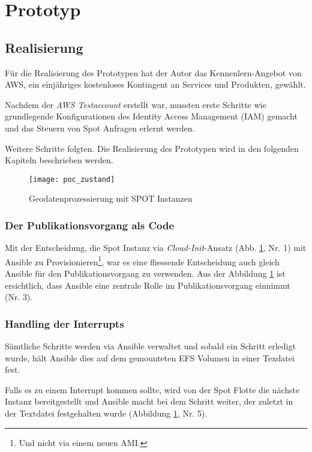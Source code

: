 \section{Prototyp}
\subsection{Realisierung}
Für die Realisierung des Prototypen hat der Autor das Kennenlern-Angebot von AWS, ein einjähriges kostenloses Kontingent an Services und Produkten\cite{FreeTier2020}, gewählt. 

Nachdem der \emph{AWS Testaccount} erstellt war, mussten erste Schritte wie grundlegende Konfigurationen des Identity Access Management (IAM) gemacht und das Steuern von Spot Anfragen erlernt werden.

Weitere Schritte folgten. Die Realisierung des Prototypen wird in den folgenden Kapiteln beschrieben werden.

\begin{figure}[H]
	\centering
	\texttt{[image: poc\_zustand]}
	\caption{Geodatenprozessierung mit SPOT Instanzen}
	\label{fig:ist_zustand}
\end{figure}

\subsubsection{Der Publikationsvorgang als Code}
Mit der Entscheidung, die Spot Instanz via \emph{Cloud-Init}-Ansatz (Abb. \ref{fig:ist_zustand}, Nr. 1) mit Ansible zu Provisionieren\footnote{Und nicht via einem neuen AMI.}, war es eine fliessende Entscheidung auch gleich Ansible für den Publikationsvorgang zu verwenden. Aus der Abbildung \ref{fig:ist_zustand} ist ersichtlich, dass Ansible eine zentrale Rolle im Publikationsvorgang einnimmt (Nr. 3). 




\subsubsection{Handling der Interrupts}
Sämtliche Schritte werden via Ansible verwaltet und sobald ein Schritt erledigt wurde, hält Ansible dies auf dem gemounteten EFS Volumen in einer Texdatei fest.

Falls es zu einem Interrupt kommen sollte, wird von der Spot Flotte die nächste Instanz bereitgestellt und Ansible macht bei dem Schritt weiter, der zuletzt in der Textdatei festgehalten wurde (Abbildung \ref{fig:ist_zustand}, Nr. 5).


